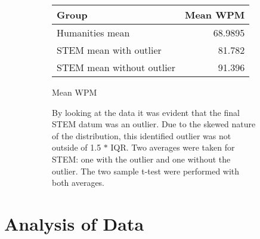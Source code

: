 \documentclass{article}
\begin{document}
\begin{figure}[ht]
    \begin{subfigure}[t]{0.55\textwidth}
        \centering
        \begin{tabular}[t]{l|r}
            \toprule
            Group & Mean WPM \\
            \midrule
            Humanities mean & 68.9895 \\
            STEM mean with outlier & 81.782 \\
            STEM mean without outlier & 91.396
        \end{tabular}
        \caption{Mean WPM}
        \label{stats:meanwpm}
    \end{subfigure}\hfill%
    \begin{subfigure}[t]{0.45\textwidth}
        By looking at the data it was evident that the final STEM datum was an
        outlier. Due to the skewed nature of the distribution, this identified
        outlier was not outside of 1.5 $*$ IQR. Two averages were taken for
        STEM: one with the outlier and one without the outlier. The two sample
        t-test were performed with both averages.
    \end{subfigure}
\end{figure}

\section{Analysis of Data}
\end{document}
